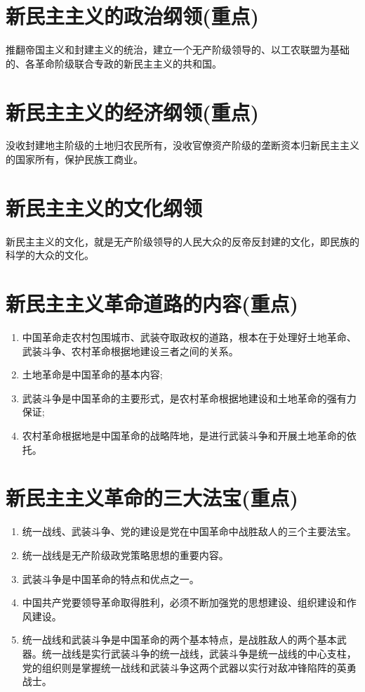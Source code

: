 \documentclass[12pt, a4paper, oneside]{ctexbook}
\begin{document}
\section{新民主主义的政治纲领(重点)}

推翻帝国主义和封建主义的统治，建立一个无产阶级领导的、以工农联盟为基础的、各革命阶级联合专政的新民主主义的共和国。

\section{新民主主义的经济纲领(重点)}

没收封建地主阶级的土地归农民所有，没收官僚资产阶级的垄断资本归新民主主义的国家所有，保护民族工商业。

\section{新民主主义的文化纲领}

新民主主义的文化，就是无产阶级领导的人民大众的反帝反封建的文化，即民族的科学的大众的文化。

\section{新民主主义革命道路的内容(重点)}

\begin{enumerate}
\item 中国革命走农村包围城市、武装夺取政权的道路，根本在于处理好土地革命、武装斗争、农村革命根据地建设三者之间的关系。

\item 土地革命是中国革命的基本内容;

\item 武装斗争是中国革命的主要形式，是农村革命根据地建设和土地革命的强有力保证;

\item 农村革命根据地是中国革命的战略阵地，是进行武装斗争和开展土地革命的依托。
\end{enumerate}

\section{新民主主义革命的三大法宝(重点)}

\begin{enumerate}
\item 统一战线、武装斗争、党的建设是党在中国革命中战胜敌人的三个主要法宝。

\item 统一战线是无产阶级政党策略思想的重要内容。

\item 武装斗争是中国革命的特点和优点之一。

\item 中国共产党要领导革命取得胜利，必须不断加强党的思想建设、组织建设和作风建设。

\item 统一战线和武装斗争是中国革命的两个基本特点，是战胜敌人的两个基本武器。统一战线是实行武装斗争的统一战线，武装斗争是统一战线的中心支柱，党的组织则是掌握统一战线和武装斗争这两个武器以实行对敌冲锋陷阵的英勇战士。
\end{enumerate}
\end{document}
